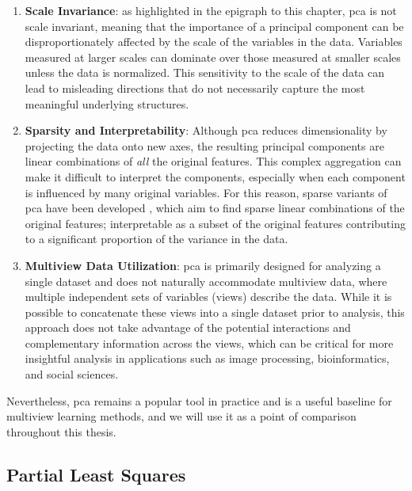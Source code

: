 \begin{enumerate}
    \item \textbf{Scale Invariance}: as highlighted in the epigraph to this chapter, \acrshort{pca} is not scale invariant, meaning that the importance of a principal component can be disproportionately affected by the scale of the variables in the data. Variables measured at larger scales can dominate over those measured at smaller scales unless the data is normalized. This sensitivity to the scale of the data can lead to misleading directions that do not necessarily capture the most meaningful underlying structures.

    \item \textbf{Sparsity and Interpretability}: Although \acrshort{pca} reduces dimensionality by projecting the data onto new axes, the resulting principal components are linear combinations of \textit{all} the original features. This complex aggregation can make it difficult to interpret the components, especially when each component is influenced by many original variables. For this reason, sparse variants of \acrshort{pca} have been developed \citep{zou2006sparse,zou2018selective}, which aim to find sparse linear combinations of the original features; interpretable as a subset of the original features contributing to a significant proportion of the variance in the data.

    \item \textbf{Multiview Data Utilization}: \acrshort{pca} is primarily designed for analyzing a single dataset and does not naturally accommodate multiview data, where multiple independent sets of variables (views) describe the data. While it is possible to concatenate these \gls{views} into a single dataset prior to analysis, this approach does not take advantage of the potential interactions and complementary information across the views, which can be critical for more insightful analysis in applications such as image processing, bioinformatics, and social sciences.
\end{enumerate}

Nevertheless, \acrshort{pca} remains a popular tool in practice \citep{greenacre2022principal} and is a useful baseline for multiview learning methods, and we will use it as a point of comparison throughout this thesis.

\subsection{Partial Least Squares}

